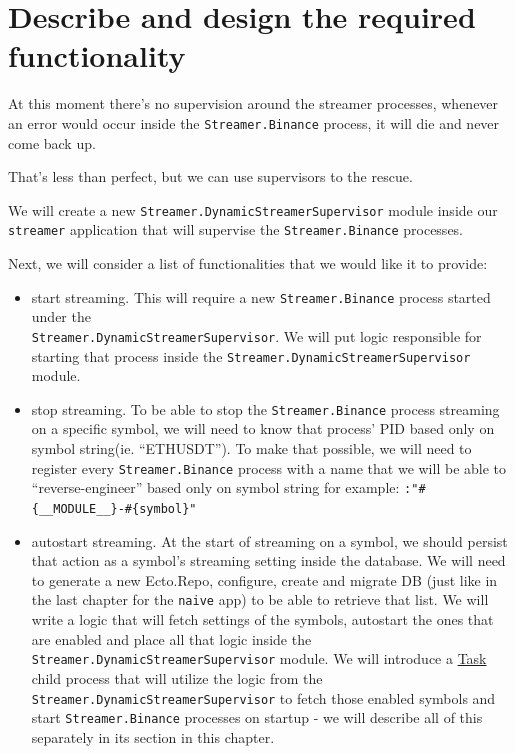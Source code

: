 \documentclass[
  oneside]{book}
\providecommand{\tightlist}{%
  \setlength{\itemsep}{0pt}\setlength{\parskip}{0pt}}
\begin{document}
\section{Describe and design the required functionality}\label{describe-and-design-the-required-functionality-2}

At this moment there's no supervision around the streamer processes, whenever an error would occur inside the \texttt{Streamer.Binance} process, it will die and never come back up.

That's less than perfect, but we can use supervisors to the rescue.

We will create a new \texttt{Streamer.DynamicStreamerSupervisor} module inside our \texttt{streamer} application that will supervise the \texttt{Streamer.Binance} processes.

Next, we will consider a list of functionalities that we would like it to provide:

\begin{itemize}
\tightlist
\item
  start streaming. This will require a new \texttt{Streamer.Binance} process started under the\\
  \texttt{Streamer.DynamicStreamerSupervisor}. We will put logic responsible for starting that process inside the \texttt{Streamer.DynamicStreamerSupervisor} module.
\item
  stop streaming. To be able to stop the \texttt{Streamer.Binance} process streaming on a specific symbol, we will need to know that process' PID based only on symbol string(ie. ``ETHUSDT''). To make that possible, we will need to register every \texttt{Streamer.Binance} process with a name that we will be able to ``reverse-engineer'' based only on symbol string for example: \texttt{:"\#\{\_\_MODULE\_\_\}-\#\{symbol\}"}
\item
  autostart streaming. At the start of streaming on a symbol, we should persist that action as a symbol's streaming setting inside the database. We will need to generate a new Ecto.Repo, configure, create and migrate DB (just like in the last chapter for the \texttt{naive} app) to be able to retrieve that list. We will write a logic that will fetch settings of the symbols, autostart the ones that are enabled and place all that logic inside the \texttt{Streamer.DynamicStreamerSupervisor} module. We will introduce a \href{https://hexdocs.pm/elixir/master/Task.html}{Task} child process that will utilize the logic from the \texttt{Streamer.DynamicStreamerSupervisor} to fetch those enabled symbols and start \texttt{Streamer.Binance} processes on startup - we will describe all of this separately in its section in this chapter.
\end{itemize}
\end{document}
